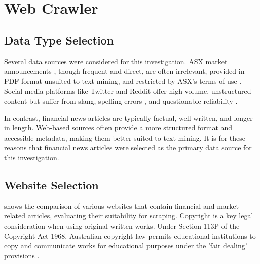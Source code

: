 \section{Web Crawler}




\subsection{Data Type Selection}

Several data sources were considered for this investigation. ASX market announcements \cite{asx_market_announcements}, though frequent and direct, are often irrelevant, provided in PDF format unsuited to text mining, and restricted by ASX's terms of use \cite{asx_terms_of_use}. Social media platforms like Twitter and Reddit offer high-volume, unstructured content but suffer from slang, spelling errors \cite{kolasani_twitter_nn}, and questionable reliability \cite{heiden_lstm}.

In contrast, financial news articles are typically factual, well-written, and longer in length. Web-based sources often provide a more structured format and accessible metadata, making them better suited to text mining. It is for these reasons that financial news articles were selected as the primary data source for this investigation.

\subsection{Website Selection}

 shows the comparison of various websites that contain financial and market-related articles, evaluating their suitability for scraping. Copyright is a key legal consideration when using original written works. Under Section 113P of the Copyright Act 1968, Australian copyright law permits educational institutions to copy and communicate works for educational purposes under the 'fair dealing' provisions \cite{copyright_act}.

